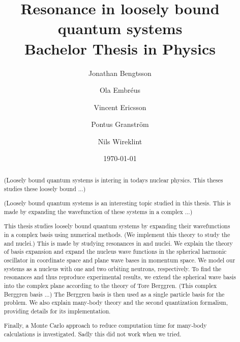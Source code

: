 \documentclass[12pt,a4paper]{report}
\begin{document}
  

\listoftodos

\title{Resonance in loosely bound quantum systems\\ 
\Large Bachelor Thesis in Physics}
\author{Jonathan Bengtsson \and Ola Embréus \and Vincent Ericsson \and Pontus Granström \and Nils Wireklint}
\date{\today}
\maketitle


\begin{abstract}
(Loosely bound quantum systems is intering in todays nuclear physics. This theses studies these loosely bound ...)

(Loosely bound quantum systems is an interesting topic studied in this thesis. This is made by expanding the wavefunction of these systems in a complex ...)

This thesis studies loosely bound quantum systems by expanding their wavefunctions in a complex basis using numerical methods. 
(We implement this theory to study the  and  nuclei.)
This is made by studying
resonances in  and  nuclei. We explain the theory of basis
expansion and expand the  nucleus wave functions in the spherical harmonic oscillator in coordinate space
and plane wave bases in momentum space. We model our systems as a  nucleus with one and two orbiting neutrons, respectively.
To find the resonances and thus reproduce experimental results, we extend the spherical wave basis into the complex plane according to the 
theory of Tore Berggren. 
(This complex Berggren basis ...) The Berggren basis is then used as a single particle
basis for the  problem. 
We also explain many-body theory and the second quantization formalism, providing details for its implementation.

Finally, a Monte Carlo approach to reduce computation time for many-body calculations is investigated.
Sadly this did not work when we tried.

\end{abstract}
\end{document}
